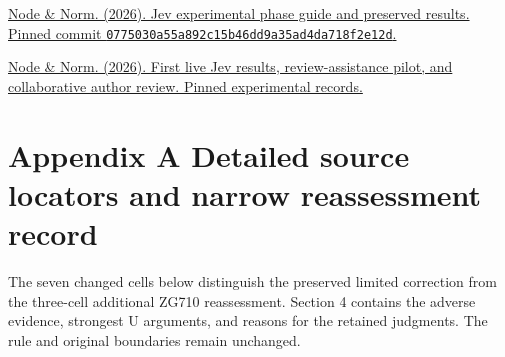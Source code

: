 \documentclass[11pt]{article}
\newenvironment{TAEReferences}{%
  \begin{list}{}{%
    \renewcommand{\makelabel}[1]{}%
    \setlength{\labelwidth}{0pt}%
    \setlength{\labelsep}{0pt}%
    \setlength{\leftmargin}{0.5in}%
    \setlength{\itemindent}{-0.5in}%
    \setlength{\itemsep}{0.45em}%
    \setlength{\parsep}{0pt}%
    \setlength{\topsep}{0.25em}%
  }%
}{\end{list}}
\begin{document}
\begin{TAEReferences}
\item{}\label{reference-67} \href{https://github.com/node-and-norm/trust-autonomy-evidence/blob/0775030a55a892c15b46dd9a35ad4da718f2e12d/docs/jev-experiments.md}{Node \& Norm. (2026). Jev experimental phase guide and preserved results. Pinned commit \texttt{0775030a\allowbreak{}55a892c1\allowbreak{}5b46dd9a\allowbreak{}35ad4da7\allowbreak{}18f2e12d}.}
\item{}\label{reference-68} \href{https://github.com/node-and-norm/trust-autonomy-evidence/blob/0775030a55a892c15b46dd9a35ad4da718f2e12d/experiments/jev/live_results_v1/REPORT.md}{Node \& Norm. (2026). First live Jev results, review-assistance pilot, and collaborative author review. Pinned experimental records.}
\end{TAEReferences}

\clearpage
{}
\section*{Appendix A Detailed source locators and narrow reassessment record}

The seven changed cells below distinguish the preserved limited correction from the three-cell additional ZG710 reassessment. Section 4 contains the adverse evidence, strongest U arguments, and reasons for the retained judgments. The rule and original boundaries remain unchanged.
\end{document}
